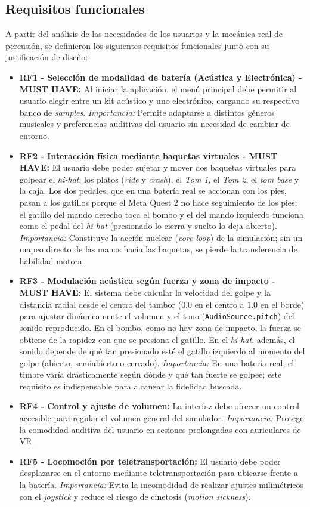 \documentclass{article}
\begin{document}
\subsection{Requisitos funcionales}
A partir del análisis de las necesidades de los usuarios y la mecánica real de percusión, se definieron los siguientes requisitos funcionales junto con su justificación de diseño:

\begin{itemize}
    \item \textbf{RF1 - Selección de modalidad de batería (Acústica y Electrónica) - MUST HAVE:} Al iniciar la aplicación, el menú principal debe permitir al usuario elegir entre un kit acústico y uno electrónico, cargando su respectivo banco de \textit{samples}. \textit{Importancia:} Permite adaptarse a distintos géneros musicales y preferencias auditivas del usuario sin necesidad de cambiar de entorno.
    \item \textbf{RF2 - Interacción física mediante baquetas virtuales - MUST HAVE:} El usuario debe poder sujetar y mover dos baquetas virtuales para golpear el \textit{hi-hat}, los platos (\textit{ride} y \textit{crash}), el \textit{Tom 1}, el \textit{Tom 2}, el \textit{tom base} y la caja. Los dos pedales, que en una batería real se accionan con los pies, pasan a los gatillos porque el Meta Quest 2 no hace seguimiento de los pies: el gatillo del mando derecho toca el bombo y el del mando izquierdo funciona como el pedal del \textit{hi-hat} (presionado lo cierra y suelto lo deja abierto). \textit{Importancia:} Constituye la acción nuclear (\textit{core loop}) de la simulación; sin un mapeo directo de las manos hacia las baquetas, se pierde la transferencia de habilidad motora.
    \item \textbf{RF3 - Modulación acústica según fuerza y zona de impacto - MUST HAVE:} El sistema debe calcular la velocidad del golpe y la distancia radial desde el centro del tambor ($0.0$ en el centro a $1.0$ en el borde) para ajustar dinámicamente el volumen y el tono (\texttt{AudioSource.pitch}) del sonido reproducido. En el bombo, como no hay zona de impacto, la fuerza se obtiene de la rapidez con que se presiona el gatillo. En el \textit{hi-hat}, además, el sonido depende de qué tan presionado esté el gatillo izquierdo al momento del golpe (abierto, semiabierto o cerrado). \textit{Importancia:} En una batería real, el timbre varía drásticamente según dónde y qué tan fuerte se golpee; este requisito es indispensable para alcanzar la fidelidad buscada.
    \item \textbf{RF4 - Control y ajuste de volumen:} La interfaz debe ofrecer un control accesible para regular el volumen general del simulador. \textit{Importancia:} Protege la comodidad auditiva del usuario en sesiones prolongadas con auriculares de VR.
    \item \textbf{RF5 - Locomoción por teletransportación:} El usuario debe poder desplazarse en el entorno mediante teletransportación para ubicarse frente a la batería. \textit{Importancia:} Evita la incomodidad de realizar ajustes milimétricos con el \textit{joystick} y reduce el riesgo de cinetosis (\textit{motion sickness}).
\end{itemize}
\end{document}
